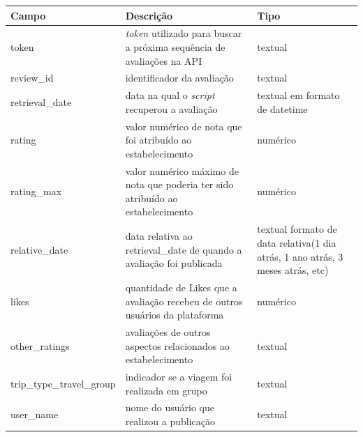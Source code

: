 \begin{table}[]
	\centering
	\begin{tabular}{|l|p{5cm}|p{5cm}|}
		\hline
		\textbf{Campo}            & \textbf{Descrição}                                                              & \textbf{Tipo}                                                                  \\
		\hline
		token                     & \emph{token} utilizado para buscar a próxima sequência de avaliações na API            & textual                                                                        \\
		\hline
		review\_id                & identificador da avaliação                                                      & textual                                                                        \\
		\hline
		retrieval\_date           & data na qual o \emph{script} recuperou a avaliação                                     & textual em formato de datetime                                                 \\
		\hline
		rating                    & valor numérico de nota que foi atribuído ao estabelecimento                     & numérico                                                                       \\
		\hline
		rating\_max               & valor numérico máximo de nota que poderia ter sido atribuído ao estabelecimento & numérico                                                                       \\
		\hline
		relative\_date            & data relativa ao retrieval\_date de quando a avaliação foi publicada            & textual formato de data relativa(1 dia atrás, 1 ano atrás, 3 meses atrás, etc) \\
		\hline
		likes                     & quantidade de Likes que a avaliação recebeu de outros usuários da plataforma    & numérico                                                                       \\
		\hline
		other\_ratings            & avaliações de outros aspectos relacionados ao estabelecimento                   & textual                                                                        \\
		\hline
		trip\_type\_travel\_group & indicador se a viagem foi realizada em grupo                                    & textual                                                                        \\
		\hline
		user\_name                & nome do usuário que realizou a publicação                                       & textual                                                                        \\

\end{tabular}
\end{table}
